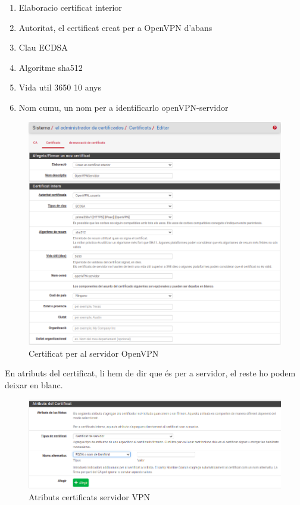 \documentclass[
  10pt,
]{krantz}
\providecommand{\tightlist}{%
  \setlength{\itemsep}{0pt}\setlength{\parskip}{0pt}}
\begin{document}
\begin{enumerate}
\def\labelenumi{\arabic{enumi}.}
\tightlist
\item
  Elaboracio certificat interior
\item
  Autoritat, el certificat creat per a OpenVPN d'abans
\item
  Clau ECDSA
\item
  Algoritme sha512
\item
  Vida util 3650 10 anys
\item
  Nom cumu, un nom per a identificarlo openVPN-servidor
\end{enumerate}

\begin{figure}
\centering
\includegraphics{imatges/proxmox/Certificat_servidor_opnvpn.png}
\caption{Certificat per al servidor OpenVPN}
\end{figure}

En atributs del certificat, li hem de dir que és per a servidor, el reste ho podem deixar en blanc.

\begin{figure}
\centering
\includegraphics{imatges/proxmox/atributa_cert_VPN.png}
\caption{Atributs certificats servidor VPN}
\end{figure}
\end{document}
